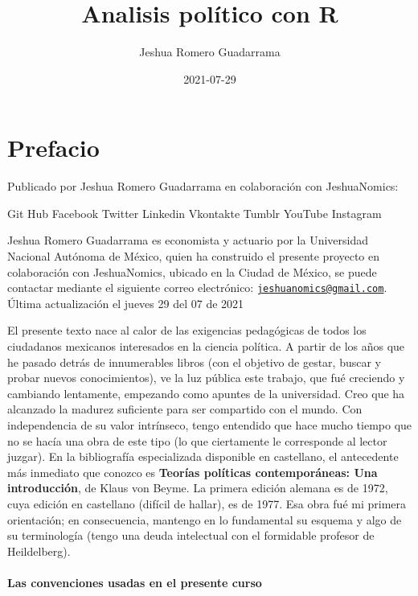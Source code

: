 \documentclass[
]{book}
\title{Analisis político con R}
\author{Jeshua Romero Guadarrama}
\date{2021-07-29}
\begin{document}
\maketitle

{
\setcounter{tocdepth}{1}
\tableofcontents
}
\hypertarget{prefacio}{%
\chapter*{Prefacio}\label{prefacio}}

Publicado por Jeshua Romero Guadarrama en colaboración con JeshuaNomics:

{ Git Hub}
{ Facebook}
{ Twitter}
{ Linkedin}
{ Vkontakte}
{ Tumblr}
{ YouTube}
{ Instagram}

Jeshua Romero Guadarrama es economista y actuario por la Universidad Nacional Autónoma de México, quien ha construido el presente proyecto en colaboración con JeshuaNomics, ubicado en la Ciudad de México, se puede contactar mediante el siguiente correo electrónico: \href{mailto:jeshuanomics@gmail.com}{\nolinkurl{jeshuanomics@gmail.com}}.
Última actualización el jueves 29 del 07 de 2021

El presente texto nace al calor de las exigencias pedagógicas de todos los ciudadanos mexicanos interesados en la ciencia política. A partir de los años que he pasado detrás de innumerables libros (con el objetivo de gestar, buscar y probar nuevos conocimientos), ve la luz pública este trabajo, que fué creciendo y cambiando lentamente, empezando como apuntes de la universidad. Creo que ha alcanzado la madurez suficiente para ser compartido con el mundo. Con independencia de su valor intrínseco, tengo entendido que hace mucho tiempo que no se hacía una obra de este tipo (lo que ciertamente le corresponde al lector juzgar). En la bibliografía especializada disponible en castellano, el antecedente más inmediato que conozco es \textbf{Teorías políticas contemporáneas: Una introducción}, de Klaus von Beyme. La primera edición alemana es de 1972, cuya edición en castellano (difícil de hallar), es de 1977. Esa obra fué mi primera orientación; en consecuencia, mantengo en lo fundamental su esquema y algo de su terminología (tengo una deuda intelectual con el formidable profesor de Heildelberg).

\hypertarget{las-convenciones-usadas-en-el-presente-curso}{%
\subsubsection*{Las convenciones usadas en el presente curso}\label{las-convenciones-usadas-en-el-presente-curso}}
\end{document}
